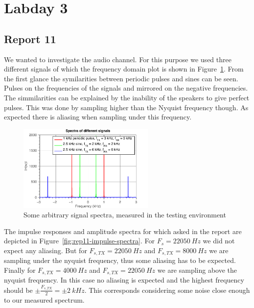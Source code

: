 \documentclass[11pt,titlepage]{report}
\begin{document}
\section{Labday 3}
\subsection{Report 11}
We wanted to investigate the audio channel. For this purpose we used three different signals of which the frequency domain plot is shown in Figure~\ref{fig:rep11-test-spectra}. From the first glance the symilarities between periodic pulses and sines can be seen. Pulses on the frequencies of the signals and mirrored on the negative frequencies. The simmilarities can be explained by the inability of the speakers to give perfect pulses. This was done by sampling higher than the Nyquist frequency though. As expected there is aliasing when sampling under this frequency.  


\begin{figure}[H]
	\centering
	\includegraphics[width=0.6\textwidth]{../../deliverable-7-resources/figures/ass-1/report-11-12-13/ass-1-report-11-random-signals.pdf}
	\caption{Some arbitrary signal spectra, measured in the testing environment}
	\label{fig:rep11-test-spectra}
\end{figure}

The impulse responses and amplitude spectra for which asked in the report are depicted in Figure~\ref{fig:rep11-impulse-spectra}. For $F_s = \SI{22050}{Hz}$ we did not expect any aliasing.  But for $F_{s,TX} = \SI{22050}{Hz}$ and $F_{s,TX} = \SI{8000}{Hz}$ we are sampling under the nyquist frequency, thus some aliasing has to be expected. Finally for $F_{s,TX} = \SI{4000}{Hz}$ and $F_{s,TX} = \SI{22050}{Hz}$ we are sampling above the nyquist frequency. In this case no aliasing is expected and the highest frequency should be $\pm \frac{F_{s,TX}}{2} = \pm \SI{2}{kHz}$. This corresponds considering some noise close enough to our measured spectrum.
\end{document}
